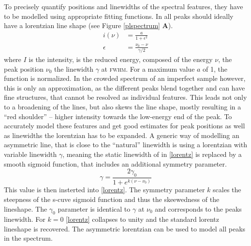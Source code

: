 To precisely quantify positions and linewidths of the spectral features, they have to be modelled using appropriate fitting functions. In \pl all peaks should ideally have a lorentzian line shape (see Figure \ref{plspectrum} \textbf{A}). 
\begin{align}
i(\nu)&= \frac{a}{1+\epsilon^2} \\
\epsilon &= \frac{\nu_0 - \nu}{\gamma /2}\label{lorentz}
\end{align}
where $I$ is the intensity, \epsilon is the reduced energy, composed of the energy $\nu$, the peak position $\nu_0$ the linewidth $\gamma$ at \textsc{fwhm}. For a maximum value $a$ of 1, the function is normalized. In the crowded spectrum of an imperfect sample however, this is only an approximation, as the different peaks blend together and can have fine structures, that cannot be resolved as individual features. This leads not only to a broadening of the lines, but also skews the line shape, mostly resulting in a ``red shoulder'' -- higher intensity towards the low-energy end of the peak. To accurately model these features and get good estimates for peak positions as well as linewidths the lorentzian has to be expanded. A generic way of modelling an asymmetric line, that is close to the ``natural'' linewidth is using a lorentzian with variable linewidth $\gamma$, meaning the static linewidth of in \ref{lorentz} is replaced by a smooth sigmoid function, that includes an additional symmetry parameter\cite{stancik_simple_2008}.
\begin{equation} \gamma = \frac{2\gamma_0}{1+e^{k(\nu-\nu_0)}}\label{asymlorentz} \end{equation}
This value is then insterted into \eqref{lorentz}. The symmetry parameter $k$ scales the steepness of the s-cuve sigmoid function and thus the skeewedness of the lineshape. The $\gamma_0$ parameter is identical to $\gamma$ at $\nu_0$ and corresponds to the peaks linewidth. For $k=0$ \eqref{lorentz} collapses to unity and the standard lorentz lineshape is recovered. The asymmetric lorentzian can be used to model all peaks in the \pl spectrum.

